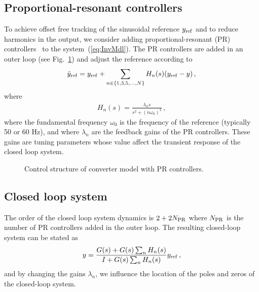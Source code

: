 \documentclass[conference,10pt]{IEEEtran}
\begin{document}


\subsection{Proportional-resonant controllers}

To achieve offset free tracking of the sinusoidal reference $y_{\rm ref}$ and to reduce harmonics in the output, we consider adding proportional-resonant (PR) controllers~\cite{fukuda2001novel} to the system~(\ref{eq:InvMdl}).
The PR controllers are added in an outer loop (see Fig.~\ref{fig:ControlStructure}) and adjust the reference according to
\begin{align*}
\tilde{y}_{\rm ref} = y_{\rm ref} + \sum_{n\in\{1,3,5,\dots, N\}}H_n(s)(y_{\rm ref}-y)\,,
\end{align*}
where
\begin{align*}
H_n(s) = \frac{\lambda_ns}{s^2 + (n\omega_0)^2}\,,
\end{align*}
where the fundamental frequency $\omega_0$ is the frequency of the reference (typically 50 or 60 Hz), and where $\lambda_n$ are the feedback gains of the PR controllers. These gains are tuning parameters whose value affect the transient response of the closed loop system.

\begin{figure}[!h]
\centering

\caption{Control structure of converter model with PR controllers.}
\label{fig:ControlStructure}
\end{figure}


\subsection{Closed loop system}

The order of the closed loop system dynamics is $2+2N_{\rm PR}$ where $N_{\rm PR}$ is the number of PR controllers added in the outer loop. The resulting closed-loop system can be stated as
\begin{align}\label{eq:ClosedLoopTF}
  y = \frac{G(s) + G(s) \sum_n H_n(s)}{I + G(s) \sum_n H_n(s)} y_{\rm ref}\,,
\end{align}
and by changing the gains $\lambda_n$, we influence the location of the poles and zeros of the closed-loop system.
\end{document}
